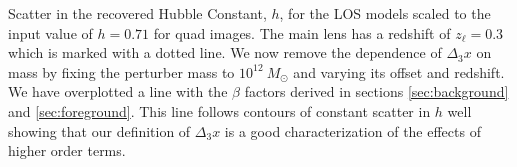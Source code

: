 \label{toyh} Scatter in the recovered Hubble Constant, $h$, for the LOS models scaled to the input value of $h=0.71$ for quad images. The main lens has a redshift of $z_\ell = 0.3$ which is marked with a dotted line. We now remove the dependence of $\Delta_3 x$ on mass by fixing the perturber mass to $10^{12}~ M_\odot$ and varying its offset and redshift. We have overplotted a line with the $\beta$ factors derived in sections \ref{sec:background} and \ref{sec:foreground}. This line follows contours of constant scatter in $h$ well showing that our definition of $\Delta_3 x$ is a good characterization of the effects of higher order terms. 
  